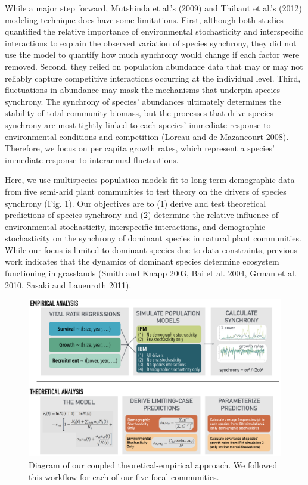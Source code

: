 \documentclass[12pt,]{article}
\begin{document}
While a major step forward, Mutshinda et al.'s (2009) and Thibaut et
al.'s (2012) modeling technique does have some limitations.
First, although both studies quantified the relative importance of environmental stochasticity and interspecific interactions to explain the observed variation of species synchrony, they did not use the model to quantify how much synchrony would change if each factor were removed.
Second, they relied on population abundance data that may or may not reliably capture competitive interactions occurring at the individual level.
Third, fluctuations in abundance may mask the mechanisms that underpin species synchrony.
The synchrony of species' abundances ultimately determines the stability of total community biomass, but the processes that drive species synchrony are most tightly linked to each species' immediate response to environmental conditions and competition
(Loreau and {{de Mazancourt}} 2008).
Therefore, we focus on per capita growth rates, which represent a species' immediate response to interannual fluctuations.

Here, we use multispecies population models fit to long-term demographic
data from five semi-arid plant communities to test theory on the drivers
of species synchrony (Fig. 1). Our objectives are to (1) derive and test
theoretical predictions of species synchrony and (2) determine the
relative influence of environmental stochasticity, interspecific
interactions, and demographic stochasticity on
the synchrony of dominant species in natural plant
communities.
While our focus is limited to dominant species due to data constraints, previous work indicates that the dynamics of dominant species determine ecosystem functioning in grasslands
(Smith and Knapp 2003, Bai et al. 2004, Grman et al. 2010, Sasaki and
Lauenroth 2011).

\begin{figure}[!ht]
  \centering
      \includegraphics[width=6in]{./components/formatted_figures/synchrony_flowchart_bw.png}
  \caption{Diagram of our coupled theoretical-empirical approach. We followed this workflow for each of our five focal communities.}
\end{figure}
\end{document}
